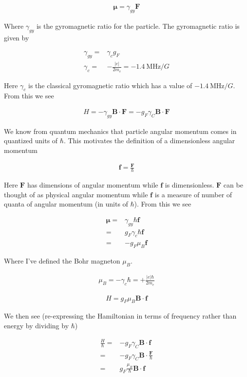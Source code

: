 \documentclass[12pt]{article}
\newcommand{\bv}[1]{\boldsymbol{#1}}
\begin{document}
\begin{align}
\bv{\mu} = \gamma_{gy}\bv{F}
\end{align}

Where $\gamma_{gy}$ is the gyromagnetic ratio for the particle.
The gyromagnetic ratio is given by

\begin{align}
\gamma_{gy} =& \gamma_c g_F\\
\gamma_c =& -\frac{|e|}{2m_e} = -\SI{1.4}{\MHz \per G}
\end{align}

Here $\gamma_c$ is the classical gyromagnetic ratio which has a value of $-\SI{1.4}{\MHz \per G}$.
From this we see

\begin{align}
H = -\gamma_{gy} \bv{B}\cdot\bv{F} = -g_F \gamma_C \bv{B}\cdot\bv{F}
\end{align}

We know from quantum mechanics that particle angular momentum comes in quantized units of $\hbar$. This motivates the definition of a dimensionless angular momentum

\begin{align}
\bv{f} = \frac{\bv{F}}{\hbar}
\end{align}

Here $\bv{F}$ has dimensions of angular momentum while $\bv{f}$ is dimensionless. 
$\bv{F}$ can be thought of as physical angular momentum while $\bv{f}$ is a measure of number of quanta of angular momentum (in units of $\hbar$).
From this we see

\begin{align}
\bv{\mu} =& \gamma_{gy}\hbar \bv{f}\\
=& g_F \gamma_c \hbar\bv{f}\\
=& -g_F \mu_B \bv{f}
\end{align}

Where I've defined the Bohr magneton $\mu_B$.

\begin{align}
\mu_B = -\gamma_c \hbar = +\frac{|e|\hbar}{2m_e}
\end{align}

\begin{align}
H = g_F \mu_B\bv{B}\cdot\bv{f}
\end{align}

We then see (re-expressing the Hamiltonian in terms of frequency rather than energy by dividing by $\hbar$)

\begin{align}
\frac{H}{\hbar} =& -g_F \gamma_C \bv{B}\cdot \bv{f}\\
=& -g_F \gamma_C \bv{B}\cdot \frac{\bv{F}}{\hbar}\\
=& g_F \frac{\mu_B}{\hbar}\bv{B}\cdot\bv{f}
\end{align}
\end{document}

